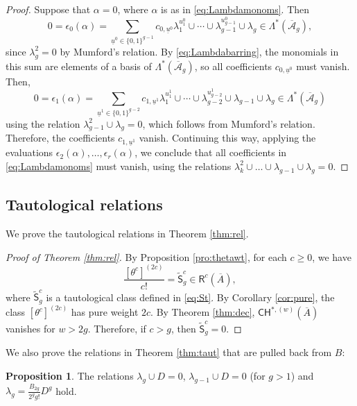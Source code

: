\documentclass[11pt]{article}
\def\CH{\mathsf{CH}}
\def\R{\mathsf{R}}
\def\Abar{\overline{\mathcal{A}}}
\newcommand{\barA}{\overline{A}}
\newcommand{\St}{\widetilde{\mathsf{S}}}
\theoremstyle{definition}
\newtheorem{proposition}[definition]{Proposition}
\begin{document}
\begin{proof}
    Suppose that $\alpha =0$, where $\alpha$ is as in \eqref{eq:Lambdamonoms}. Then
    $$
    0 = \epsilon_0 \left(\alpha\right) = \sum_{\underline{u}^0 \in \{0,1\}^{g-1}}c_{0, \underline{u}^0}\lambda_{1}^{u^0_1}\cup  \cdots\cup  \lambda_{g-1}^{u^0_{g-1}}\cup \lambda_{g} \in \Lambda^*(\Abar_g),
    $$
    since $\lambda_g^2=0$ by Mumford's relation. By \eqref{eq:Lambdabarring}, the monomials in this sum are elements of a basis of $\Lambda^*(\Abar_g)$, so all coefficients $c_{0,\underline{u}^0}$ must vanish. Then,
    $$
    0 = \epsilon_1 \left(\alpha\right) =\sum_{\underline{u}^1 \in \{0,1\}^{g-2}}c_{1, \underline{u}^1}\lambda_{1}^{u^1_1}\cup  \cdots\cup  \lambda_{g-2}^{u^1_{g-2}}\cup \lambda_{g-1} \cup \lambda_{g} \in \Lambda^*(\Abar_g)
    $$
    using the relation $\lambda_{g-1}^2 \cup \lambda_g=0$, which follows from Mumford's relation. Therefore, the coefficients $c_{1, \underline{u}^1}$ vanish. Continuing this way, applying the evaluations $\epsilon_2(\alpha) , \ldots , \epsilon_r(\alpha)$, we conclude that all coefficients in \eqref{eq:Lambdamonoms} must vanish, using the relations $\lambda_k^2 \cup \ldots \cup \lambda_{g-1}\cup\lambda_g =0$.
\end{proof}

\subsection{Tautological relations}

We prove the tautological relations in Theorem \ref{thm:rel}.

\begin{proof}[Proof of Theorem \ref{thm:rel}]
    By Proposition \ref{pro:thetawt}, for each $c \geq 0$, we have
    \[
    \frac{[\theta^c]^{(2c)}}{c!} = \St_g^c \in \R^c(\barA),
    \]
    where $\St^c_g$ is a tautological class defined in \eqref{eq:St}. By Corollary \ref{cor:pure}, the class $[\theta^c]^{(2c)}$ has pure
    weight $2c$. By Theorem \ref{thm:dec}, $\CH^{*,{(w)}}(\barA)$ vanishes for
    $w > 2g$. Therefore, if $c > g$, then $\St_g^c = 0$.
\end{proof}

We also prove the relations in Theorem \ref{thm:taut} that are pulled back from $B$:
\begin{proposition}\label{pro:relB}
    The relations $\lambda_g\cup D = 0$, $\lambda_{g-1}\cup D=0$ (for $g>1$) and $\lambda_g = \frac{B_{2g}}{2^gg!}D^g$ hold.
\end{proposition}
\end{document}
